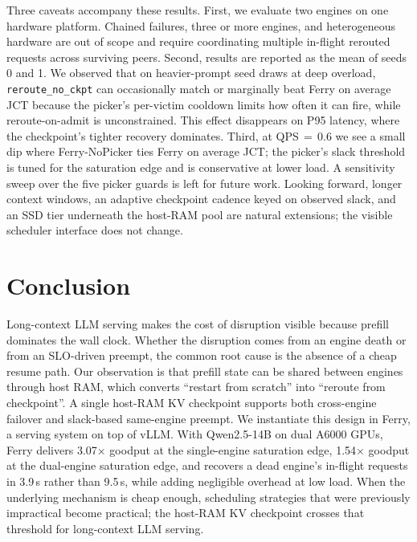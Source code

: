 Three caveats accompany these results. First, we evaluate two engines on one hardware platform. Chained failures, three or more engines, and heterogeneous hardware are out of scope and require coordinating multiple in-flight rerouted requests across surviving peers. Second, results are reported as the mean of seeds 0 and 1. We observed that on heavier-prompt seed draws at deep overload, \texttt{reroute\_no\_ckpt} can occasionally match or marginally beat Ferry on average JCT because the picker's per-victim cooldown limits how often it can fire, while reroute-on-admit is unconstrained. This effect disappears on P95 latency, where the checkpoint's tighter recovery dominates. Third, at QPS$\,=\,$0.6 we see a small dip where Ferry-NoPicker ties Ferry on average JCT; the picker's slack threshold is tuned for the saturation edge and is conservative at lower load. A sensitivity sweep over the five picker guards is left for future work. Looking forward, longer context windows, an adaptive checkpoint cadence keyed on observed slack, and an SSD tier underneath the host-RAM pool are natural extensions; the visible scheduler interface does not change.

\section{Conclusion}

Long-context LLM serving makes the cost of disruption visible because prefill dominates the wall clock. Whether the disruption comes from an engine death or from an SLO-driven preempt, the common root cause is the absence of a cheap resume path. Our observation is that prefill state can be shared between engines through host RAM, which converts ``restart from scratch'' into ``reroute from checkpoint''. A single host-RAM KV checkpoint supports both cross-engine failover and slack-based same-engine preempt. We instantiate this design in Ferry, a serving system on top of vLLM. With Qwen2.5-14B on dual A6000 GPUs, Ferry delivers 3.07$\times$ goodput at the single-engine saturation edge, 1.54$\times$ goodput at the dual-engine saturation edge, and recovers a dead engine's in-flight requests in 3.9\,s rather than 9.5\,s, while adding negligible overhead at low load. When the underlying mechanism is cheap enough, scheduling strategies that were previously impractical become practical; the host-RAM KV checkpoint crosses that threshold for long-context LLM serving.





